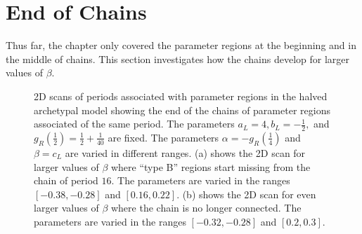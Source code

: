 \section{End of Chains}
\label{sec:arch.end}

Thus far, the chapter only covered the parameter regions at the beginning and in the middle of chains.
This section investigates how the chains develop for larger values of $\beta$.

\begin{figure}
	\centering
	\caption[2D scans of periods associated with parameter regions in the halved archetypal model showing the end of the chains]{
		2D scans of periods associated with parameter regions in the halved archetypal model showing the end of the chains of parameter regions associated of the same period.
		The parameters $a_L = 4, b_L = -\frac{1}{2},$ and $g_R\left(\frac{1}{2}\right) = \frac{1}{2} + \frac{1}{40}$ are fixed.
		The parameters $\alpha = -g_R\left(\frac{1}{4}\right)$ and $\beta = c_L$ are varied in different ranges.
		(a) shows the 2D scan for larger values of $\beta$ where ``type B'' regions start missing from the chain of period $16$.
		The parameters are varied in the ranges $[-0.38, -0.28]$ and $[0.16, 0.22]$.
		(b) shows the 2D scan for even larger values of $\beta$ where the chain is no longer connected.
		The parameters are varied in the ranges $[-0.32, -0.28]$ and $[0.2, 0.3]$.
	}
\end{figure}

